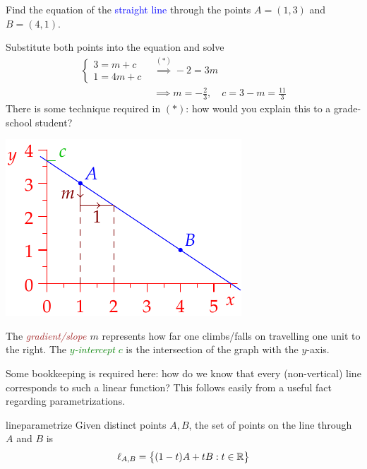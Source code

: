 \begin{example}{}{}
	Find the equation of the \textcolor{blue}{straight line} through the points $A=(1,3)$ and $B=(4,1)$.
	\par
	\begin{minipage}[t]{0.64\linewidth}\vspace{-5pt}
		Substitute both points into the equation and solve
		\begin{align*}
			\begin{cases}
			3=m+c\\
			1=4m+c
			\end{cases}
			&\overset{(\ast)}{\implies} -2=3m\\
			&\implies m=-\frac 23,\quad c=3-m=\frac{11}3
		\end{align*}
		There is some technique required in $(\ast)$: how would you explain this to a grade-school student?
	\end{minipage}
	\hfill
	\begin{minipage}[t]{0.35\linewidth}\vspace{-5pt}
		\flushright\includegraphics{line-line}
	\end{minipage}
	\medbreak
	
	The \emph{\textcolor{Brown}{gradient/slope} $m$} represents how far one climbs/falls on travelling one unit to the right.
	\smallbreak
	The \textcolor{Green}{\emph{$y$-intercept} $c$} is the intersection of the graph with the $y$-axis.
	\tcblower
\end{example}


Some bookkeeping is required here: how do we know that every (non-vertical) line corresponds to such a linear function? This follows easily from a useful fact regarding parametrizations.

\begin{thm}{}{lineparametrize}
	Given distinct points $A,B$, the set of points on the line through $A$ and $B$ is
	\[
		\ell_{A,B}=\bigl\{(1-t)A+tB:t\in\mathbb{R}\bigr\}
	\]
\end{thm}


